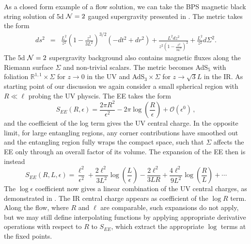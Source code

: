 \documentclass[11 pt]{article}
\begin{document}
As a closed form example of a flow solution, we can take the BPS magnetic black string solution of 5d ${\cal N}=2$ gauged supergravity presented in \cite{Klemm:2000nj}. The metric takes the form
\begin{eqnarray}
    ds^2 &=& \frac{L^2}{z^2}\left(1-\frac{z^2}{3L^2}\right)^{3/2}(-dt^2+dr^2) + \frac{L^2dz^2}{z^2 \left(1-\frac{z^2}{3L^2}\right)^2} + \frac{L^2}{z^2}d\Sigma^2.
\end{eqnarray}
The 5d ${\cal N}=2$ supergravity background also contains magnetic fluxes along the Riemann surface $\Sigma$ and non-trivial scalars. 
The metric becomes AdS$_5$ with foliation $\mathbb{R}^{1,1}\times \Sigma$ for $z\to 0$ in the UV and AdS$_3\times \Sigma$ for $z\to \sqrt{3}L$ in the IR.
As starting point of our discussion we again consider a small spherical region with $R\ll \ell$ probing the UV physcis. The EE takes the form
\begin{equation}
    S_{EE}(R,\epsilon) = \frac{2\pi R^2}{\epsilon^2} - 2\pi\log\left(\frac{R}{\epsilon}\right) +\mathcal{O}(\epsilon^0)\,,
\end{equation}
and the coefficient of the log term gives the UV central charge. In the opposite limit, for large entangling regions, any corner contributions have smoothed out and the entangling region fully wraps the compact space, such that $\Sigma$ affects the EE only through an overall factor of its volume. The expansion of the EE then is instead
\begin{equation}
    S_{EE}(R,L,\epsilon) = \frac{\ell^2}{\epsilon^2}+\frac{2\ell^2}{3L^2}\log\left(\frac{L}{\epsilon}\right)-\frac{2\ell^2}{3L R}+\frac{4 \ell^2}{9 L^2}\log\left(\frac{R}{L}\right)+\cdots
\end{equation}
The $\log \epsilon$ coefficient now gives a linear combination of the UV central charges, as demonstrated in \cite{GonzalezLezcano:2022mcd}.
The IR central charge appears as coefficient of the $\log R$ term.  Along the flow, where $R$ and $\ell$ are comparable, such expansions do not apply, but we may still define interpolating functions by applying appropriate derivative operations with respect to $R$ to $S_{EE}$, which extract the appropriate $\log$ terms at the fixed points. 
\end{document}
